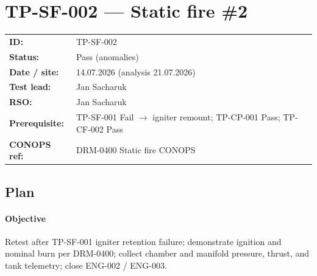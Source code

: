 \section{TP-SF-002 --- Static fire \#2}

\begin{tabular}{@{}ll@{}}
\textbf{ID:} & TP-SF-002 \\
\textbf{Status:} & Pass (anomalies) \\
\textbf{Date / site:} & 14.07.2026 (analysis 21.07.2026) \\
\textbf{Test lead:} & Jan Sacharuk \\
\textbf{RSO:} & Jan Sacharuk \\
\textbf{Prerequisite:} & TP-SF-001 Fail $\rightarrow$ igniter remount; TP-CP-001 Pass; TP-CF-002 Pass \\
\textbf{CONOPS ref:} & DRM-0400 Static fire CONOPS \\
\end{tabular}

\subsection*{Plan}

\paragraph{Objective}
Retest after TP-SF-001 igniter retention failure; demonstrate ignition and
nominal burn per DRM-0400; collect chamber and manifold pressure, thrust, and tank telemetry;
close ENG-002 / ENG-003.

